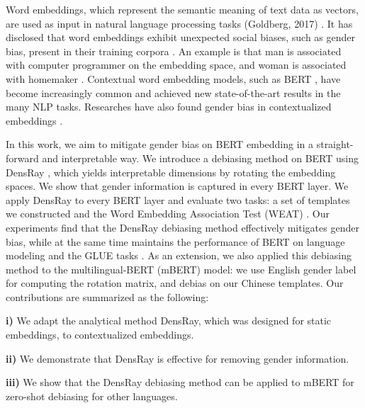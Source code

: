 Word embeddings, which represent the semantic meaning of text data as vectors, are used as input in natural language processing tasks (Goldberg, 2017) . It has disclosed that word embeddings exhibit unexpected social biases, such as gender bias, present in their training corpora \citep{bolukbasi2016man, caliskan2017semantics,garg2018word}. An example is that man is associated with computer programmer on the embedding space, and woman is associated with homemaker \citep{bolukbasi2016man}. Contextual word embedding models, such as BERT \citep{devlin2018bert}, have become increasingly common and achieved new state-of-the-art results in the many NLP tasks. Researches have also found gender bias in contextualized embeddings \citep{zhao2019gender,may2019measuring}.


In this work, we aim to mitigate gender bias on BERT embedding in a straight-forward and interpretable way. We introduce a debiasing method on BERT using DensRay \citep{dufter2019analytical}, which yields interpretable dimensions by rotating the embedding spaces. We show that gender information is captured in every BERT layer. We apply DensRay to every BERT layer and evaluate two tasks: a set of templates we constructed and the Word Embedding Association Test (WEAT) \citep{caliskan2017semantics}. Our experiments find that the DensRay debiasing method effectively mitigates gender bias, while at the same time maintains the performance of BERT on language modeling and the GLUE tasks \citep{wang2018glue}. As an extension, we also applied this debiasing method to the multilingual-BERT (mBERT) model: we use English gender label for computing the rotation matrix, and debias on our Chinese templates. Our contributions are summarized as the following: 

\textbf{i)} We adapt the analytical method DensRay, which was designed for static embeddings, to contextualized embeddings. 

\textbf{ii)} We demonstrate that DensRay is effective for removing gender information.

\textbf{iii)}  We show that the DensRay debiasing method can be applied to mBERT for zero-shot debiasing for other languages.